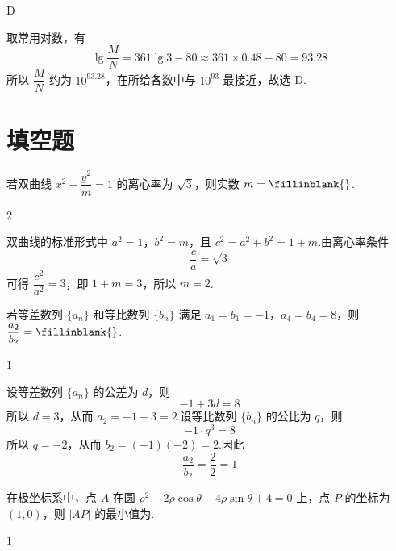\begin{answer}
D
\end{answer}

\begin{solution}
取常用对数，有
\[
\lg\frac{M}{N}=361\lg3-80\approx361\times0.48-80=93.28
\]
所以 \(\dfrac{M}{N}\) 约为 \(10^{93.28}\)，在所给各数中与 \(10^{93}\) 最接近，故选 D.
\end{solution}

\section{填空题}

\begin{problem}
若双曲线 \(x^2-\dfrac{y^2}{m}=1\) 的离心率为 \(\sqrt3\)，则实数 \(m=\fillinblank{}\).
\end{problem}

\begin{answer}
\(2\)
\end{answer}

\begin{solution}
双曲线的标准形式中 \(a^2=1\)，\(b^2=m\)，且 \(c^2=a^2+b^2=1+m\).由离心率条件
\[
\frac{c}{a}=\sqrt3
\]
可得 \(\dfrac{c^2}{a^2}=3\)，即 \(1+m=3\)，所以 \(m=2\).
\end{solution}

\begin{problem}
若等差数列 \(\{a_n\}\) 和等比数列 \(\{b_n\}\) 满足 \(a_1=b_1=-1\)，\(a_4=b_4=8\)，则 \(\dfrac{a_2}{b_2}=\fillinblank{}\).
\end{problem}

\begin{answer}
\(1\)
\end{answer}

\begin{solution}
设等差数列 \(\{a_n\}\) 的公差为 \(d\)，则
\[
-1+3d=8
\]
所以 \(d=3\)，从而 \(a_2=-1+3=2\).设等比数列 \(\{b_n\}\) 的公比为 \(q\)，则
\[
-1\cdot q^3=8
\]
所以 \(q=-2\)，从而 \(b_2=(-1)(-2)=2\).因此
\[
\frac{a_2}{b_2}=\frac22=1
\]
\end{solution}

\begin{problem}
在极坐标系中，点 \(A\) 在圆 \(\rho^2-2\rho\cos\theta-4\rho\sin\theta+4=0\) 上，点 \(P\) 的坐标为 \((1,0)\)，则 \(|AP|\) 的最小值为\fillinblank{}.
\end{problem}

\begin{answer}
\(1\)
\end{answer}

